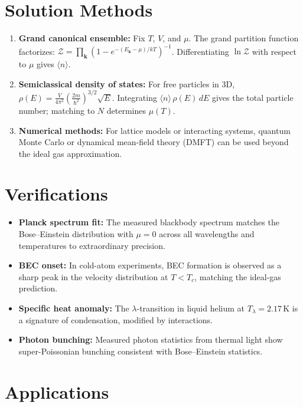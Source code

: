 \section*{Solution Methods}

\begin{enumerate}
\item \textbf{Grand canonical ensemble:} Fix $T$, $V$, and $\mu$. The grand partition function factorizes: $\mathcal{Z} = \prod_{\mathbf{k}} (1 - e^{-(E_{\mathbf{k}}-\mu)/kT})^{-1}$. Differentiating $\ln \mathcal{Z}$ with respect to $\mu$ gives $\langle n \rangle$.
\item \textbf{Semiclassical density of states:} For free particles in 3D, $\rho(E) = \frac{V}{4\pi^2}\left(\frac{2m}{\hbar^2}\right)^{3/2} \sqrt{E}$. Integrating $\langle n \rangle \, \rho(E) \, dE$ gives the total particle number; matching to $N$ determines $\mu(T)$.
\item \textbf{Numerical methods:} For lattice models or interacting systems, quantum Monte Carlo or dynamical mean-field theory (DMFT) can be used beyond the ideal gas approximation.
\end{enumerate}
\section*{Verifications}

\begin{itemize}
\item \textbf{Planck spectrum fit:} The measured blackbody spectrum matches the Bose--Einstein distribution with $\mu = 0$ across all wavelengths and temperatures to extraordinary precision.
\item \textbf{BEC onset:} In cold-atom experiments, BEC formation is observed as a sharp peak in the velocity distribution at $T < T_c$, matching the ideal-gas prediction.
\item \textbf{Specific heat anomaly:} The $\lambda$-transition in liquid helium at $T_\lambda = 2.17$\,K is a signature of condensation, modified by interactions.
\item \textbf{Photon bunching:} Measured photon statistics from thermal light show super-Poissonian bunching consistent with Bose--Einstein statistics.
\end{itemize}
\section*{Applications}

